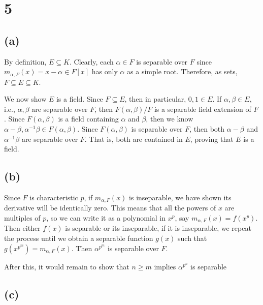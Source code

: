 \documentclass[12pt]{article}
\theoremstyle{definition}
\begin{document}
\newpage
\section*{5}


\subsection*{(a)}

By definition, $E \subseteq K$. Clearly, each $\alpha \in F$ is separable over $F$ since $m_{\alpha, F}(x) = x - \alpha \in F[x]$ has only $\alpha$ as a simple root. Therefore, as sets, $F \subseteq E \subseteq K$.

We now show $E$ is a field. Since $F \subseteq E$, then in particular, $0, 1 \in E$. If $\alpha, \beta \in E$, i.e., $\alpha, \beta$ are separable over $F$, then $F(\alpha, \beta)/F$ is a separable field extension of $F$. Since $F(\alpha, \beta)$ is a field containing $\alpha$ and $\beta$, then we know $\alpha - \beta, \alpha^{-1}\beta \in F(\alpha, \beta)$. Since $F(\alpha, \beta)$ is separable over $F$, then both $\alpha - \beta$ and $\alpha^{-1}\beta$ are separable over $F$. That is, both are contained in $E$, proving that $E$ is a field. 


\subsection*{(b)}

Since $F$ is characteristic $p$, if $m_{\alpha, F}(x)$ is inseparable, we have shown its derivative will be identically zero. This means that all the powers of $x$ are multiples of $p$, so we can write it as a polynomial in $x^p$, say $m_{\alpha, F}(x) = f(x^p)$. Then either $f(x)$ is separable or its inseparable, if it is inseparable, we repeat the process until we obtain a separable function $g(x)$ such that $g(x^{p^m}) = m_{\alpha, F}(x)$. Then $\alpha^{p^m}$ is separable over $F$.

After this, it would remain to show that $n \geq m$ implies $\alpha^{p^n}$ is separable


\subsection*{(c)}
\end{document}
